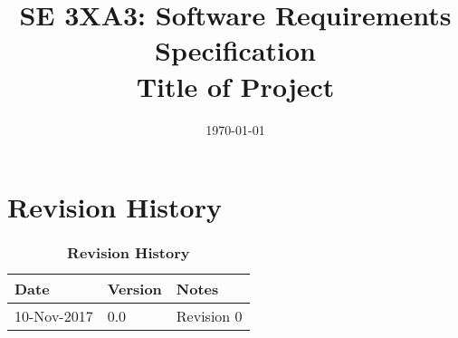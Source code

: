 \documentclass[12pt, titlepage]{article}
\title{SE 3XA3: Software Requirements Specification\\Title of Project}
\date{\today}
\newcommand{\revisionTable}{
	\begin{table}[hp]
		
		\begin{tabularx}{\textwidth}{p{3cm}p{2cm}X}
			\toprule {\bf Date} & {\bf Version} & {\bf Notes}\\
			\midrule
			
			10-Nov-2017 & 0.0 & Revision 0\\
			
			\bottomrule
		\end{tabularx}
		\caption{\bf Revision History}
	\end{table}
}
\begin{document}


%
%
%
%








\def\thesection{\arabic{section}} 
\renewcommand\thesection{\arabic{section}} 
\renewcommand\thesubsection{\thesection.\arabic{subsection}}

\tableofcontents

\listoftables

\listoffigures


\newpage

\section{Revision History}
\revisionTable
\end{document}

